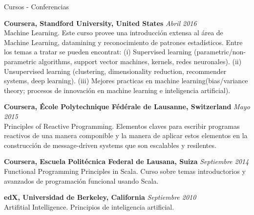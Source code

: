\documentclass[spanish]{resume} %
\begin{document}
\begin{rSection}{Cursos - Conferencias}


{\bf Coursera, Standford University, United States} \hfill {\em Abril 2016} \\
Machine Learning.
Este curso provee una introducción extensa al área de Machine Learning, datamining y reconocimiento de patrones estadísticos. Entre los temas a tratar se pueden encontrat: (i) Supervised learning (parametric/non-parametric algorithms, support vector machines, kernels, redes neuronales). (ii) Unsupervised learning (clustering, dimensionality reduction, recommender systems, deep learning). (iii) Mejores practicas en machine learning(bias/variance theory; procesos de innovación en machine learning e inteligencia artificial).


{\bf Coursera, \'Ecole Polytechnique F\'ed\'erale de Lausanne, Switzerland} \hfill {\em Mayo 2015} \\
Principles of Reactive Programming.
Elementos claves para escribir programas reactivos de una manera componible y la manera de aplicar estos elementos en la construcción de message-driven systems que son escalables y resilentes. 


{\bf Coursera, Escuela Polit\'ecnica Federal de Lausana, Suiza} \hfill {\em Septiembre 2014} \\
Functional Programming Principles in Scala.
Curso sobre temas introductorios y avanzados de programaci\'on funcional usando Scala.

{\bf edX, Universidad de Berkeley, California} \hfill {\em Septiembre 2010} \\
Artifitial Intelligence.
Principios de inteligencia artificial.

\end{rSection}
\end{document}
